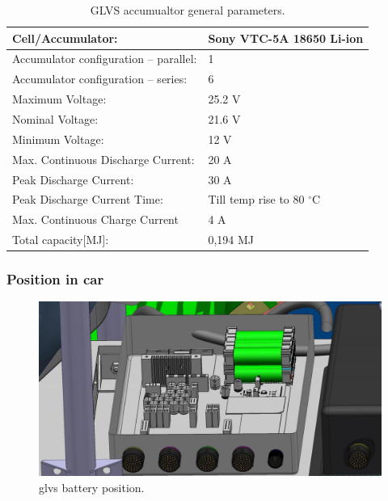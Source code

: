 \begin{table}[H]
	\centering
	\caption{GLVS accumualtor general parameters.}
	\begin{tabu}{|X|X|}\hline
		Cell/Accumulator: & Sony VTC-5A 18650 Li-ion\\\hline
		Accumulator configuration – parallel: & 1 \\\hline
		Accumulator configuration – series: & 6 \\\hline
		Maximum Voltage: & 25.2 V \\\hline
		Nominal Voltage: & 21.6 V \\\hline
		Minimum Voltage: & 12 V \\\hline
		Max. Continuous Discharge Current: & 20 A \\\hline
		Peak Discharge Current: & 30 A \\\hline
		Peak Discharge Current Time: & Till temp rise to 80 $^\circ$C \\\hline
		Max. Continuous Charge Current & 4 A\\\hline
		Total capacity[MJ]: & 0,194 MJ \\\hline
	\end{tabu}%
	\label{tab:LVbatt-general}%
\end{table}%

\subsubsection{Position in car}

\begin{figure}[H]
	\centering
	\includegraphics[width=\textwidth,clip]{./img/ECUB_BATTERY_POSITION.jpg}
	\caption{\gls{glvs} battery position.}
	\label{fig:GLVS_battery_position}
\end{figure}